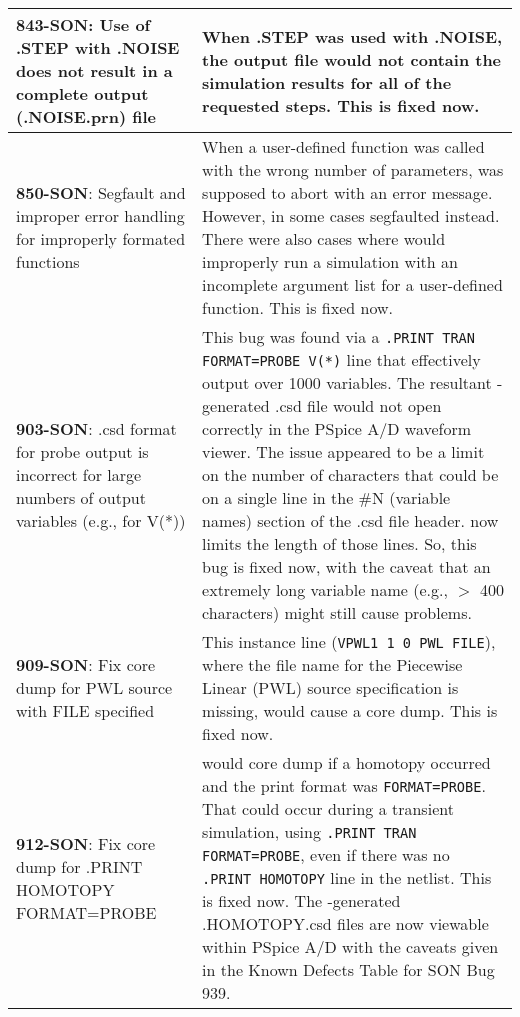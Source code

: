 {\begin{longtable}[h] {>{\raggedright\small}m{2in}|>{\raggedright\let\\\tabularnewline\small}m{3.5in}}
     \textbf{843-SON}: Use of .STEP with .NOISE does not result in a complete output
     (.NOISE.prn) file & When .STEP was used with .NOISE, the output file would not 
     contain the simulation results for all of the requested steps. This is fixed now.
     \\ \hline

     \textbf{850-SON}: Segfault and improper error handling for improperly formated functions &
     When a user-defined function was called with the wrong number of parameters, \Xyce{} was 
     supposed to abort with an error message.  However, in some cases \Xyce{} segfaulted instead.  
     There were also cases where \Xyce{} would improperly run a simulation with an incomplete 
     argument list for a user-defined function.  This is fixed now. \\ \hline

     \textbf{903-SON}: .csd format for probe output is incorrect for large numbers 
     of output variables (e.g., for V(*)) &  This bug was found via a 
     \texttt{.PRINT TRAN FORMAT=PROBE V(*)} line that effectively output over 1000 
     variables.  The resultant \Xyce{}-generated .csd file would not open correctly 
     in the PSpice A/D waveform viewer.  The issue appeared to be a limit on the number of 
     characters that could be on a single line in the \#N (variable names) section of the 
     .csd file header.  \Xyce{} now limits the length of those lines.  So, this bug is fixed
     now, with the caveat that an extremely long variable name (e.g., $>$ 400 characters)
     might still cause problems. \\ \hline

     \textbf{909-SON}: Fix core dump for PWL source with FILE specified & This instance
     line (\texttt{VPWL1 1 0 PWL FILE}), where the file name for the Piecewise Linear
     (PWL) source specification is missing, would cause a core dump. This is fixed 
     now. \\ \hline

     \textbf{912-SON}: Fix core dump for .PRINT HOMOTOPY FORMAT=PROBE & \Xyce{}
     would core dump if a homotopy occurred and the print format was 
     \texttt{FORMAT=PROBE}.  That could occur during a transient simulation, using
     \texttt{.PRINT TRAN FORMAT=PROBE}, even if there was no \texttt{.PRINT
     HOMOTOPY} line in the netlist.  This is fixed now.  The \Xyce{}-generated
     .HOMOTOPY.csd files are now viewable within PSpice A/D with the caveats given
     in the Known Defects Table for SON Bug 939. \\ \hline
     

\end{longtable}}
